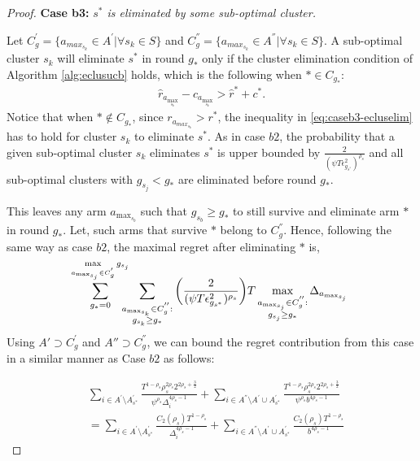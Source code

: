 \begin{proof}
\textbf{Case b3:} \textit{$s^{*}$ is eliminated by some sub-optimal cluster.} 

Let $C_{g}^{'}=\lbrace a_{max_{s_{k}}}\in A^{'}|\forall s_{k}\in S \rbrace$ and $C_{g}^{''}=\lbrace a_{max_{s_{k}}}\in A^{''}|\forall s_{k}\in S \rbrace$. A sub-optimal cluster $s_k$ will eliminate $s^*$ in round $g_*$ only if the cluster elimination condition of Algorithm \ref{alg:eclusucb} holds, which is the following when ${*}\in C_{g_{*}}$:
\begin{align}
\hat r_{a_{\max_{s_k}}} - c_{a_{\max_{s_k}}} > \hat{r}^{*}+ c^{*}.
\label{eq:caseb3-ecluselim}
\end{align}
Notice that when ${*}\notin C_{g_{*}}$, since $r_{a_{max_{s_{k}}}}>r^{*}$, the inequality in \eqref{eq:caseb3-ecluselim} has to hold for cluster $s_k$ to eliminate $s^*$.
As in case $b2$, the probability that a given sub-optimal cluster $s_k$ eliminates $s^*$ is upper bounded by  $\frac{2}{(\psi T\epsilon_{g_{s^{*}}}^{2})^{\rho_{s}}}$ and all sub-optimal clusters with $g_{s_{j}}< g_{*}$ are eliminated before round $g_*$. 

This leaves any arm $a_{\max_{s_{b}}}$ such that $g_{s_{b}}\geq g_{*}$ to still survive and eliminate arm ${*}$ in round $g_{*}$. Let, such arms that survive ${*}$ belong to $C_{g}^{''}$. Hence, following the same way as case $b2$,  the maximal regret after eliminating ${*}$ is,
 \begin{align*}
 \!\!\sum_{g_{*}=0}^{\max\limits_{a_{\max_{s_{j}}}\in C_{g}^{'}}g_{s_{j}}}\!\!\!\!\!\sum_{\substack{\scriptsize a_{\max_{s_{k}}}\in C_{g}^{''}: \\ g_{s_{k}} \geq g_{*}}}\bigg(\dfrac{2}{(\psi T\epsilon_{g_{s^{*}}}^{2})^{\rho_{s}}} \bigg)T\max_{\substack{a_{\max_{s_{j}}}\in C_{g}^{''}: \\ g_{s_{j}}\geq g_{*}}}{\Delta}_{a_{\max_{s_{j}}}}
 \end{align*}
Using $A'\supset C_{g}^{'}$ and $A''\supset C_{g}^{''}$, we can bound the regret contribution from this case in a similar manner as Case $b2$ as follows:

\begin{align*}
 &\!\!\sum_{i\in A^{'}\setminus A_{s^*}^{'}}\frac{T^{1-\rho_{s}}\rho_{s}^{2\rho_{s}}2^{2\rho_{s}+\frac{3}{2}}}{\psi^{\rho_{s}}\Delta_{i}^{4\rho_{s}-1}} 
 \!+\!\!\!\sum_{i\in A^{''}\setminus A^{'}\cup A_{s^*}^{'}}\!\!\!\!\frac{T^{1-\rho_{s}}\rho_{s}^{2\rho_{s}}2^{2\rho_{s}+\frac{3}{2}}}{\psi^{\rho_{s}}b^{4\rho_{s}-1}} \\
 & = \sum_{i\in A^{'}\setminus A_{s^*}^{'}}\frac{C_{2}(\rho_{s})T^{1-\rho_{s}}}{\Delta_{i}^{4\rho_{s}-1}} +\sum_{i\in A^{''}\setminus A^{'}\cup A_{s^*}^{'}}\frac{C_{2}(\rho_{s})T^{1-\rho_{s}}}{b^{4\rho_{s}-1}} 
\end{align*}




\end{proof}
